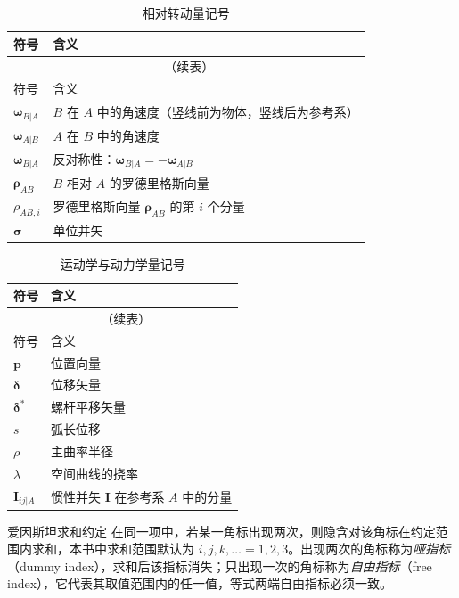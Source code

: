 \begin{longtable}{ll}
\caption{相对转动量记号}\label{tab:符号说明:相对量}\\
\toprule
符号 & 含义 \\
\midrule
\endfirsthead
\multicolumn{2}{c}{\tablename~\thetable{}（续表）}\\
\toprule
符号 & 含义 \\
\midrule
\endhead
$\bm{\omega}_{B|A}$ & $B$ 在 $A$ 中的角速度（竖线前为物体，竖线后为参考系） \\
$\bm{\omega}_{A|B}$ & $A$ 在 $B$ 中的角速度 \\
$\bm{\omega}_{B|A}$ & 反对称性：$\bm{\omega}_{B|A}=-\bm{\omega}_{A|B}$ \\
$\bm{\rho}_{AB}$ & $B$ 相对 $A$ 的罗德里格斯向量 \\
$\rho_{AB,i}$ & 罗德里格斯向量 $\bm{\rho}_{AB}$ 的第 $i$ 个分量 \\
$\bm{\sigma}$ & 单位并矢 \\
\bottomrule
\end{longtable}

\begin{longtable}{ll}
\caption{运动学与动力学量记号}\label{tab:符号说明:运动学}\\
\toprule
符号 & 含义 \\
\midrule
\endfirsthead
\multicolumn{2}{c}{\tablename~\thetable{}（续表）}\\
\toprule
符号 & 含义 \\
\midrule
\endhead
$\mathbf{p}$ & 位置向量 \\
$\bm{\delta}$ & 位移矢量 \\
$\bm{\delta}^{*}$ & 螺杆平移矢量 \\
$s$ & 弧长位移 \\
$\rho$ & 主曲率半径 \\
$\lambda$ & 空间曲线的挠率 \\
$\bm{I}_{ij|A}$ & 惯性并矢 $\bm{I}$ 在参考系 $A$ 中的分量 \\
\bottomrule
\end{longtable}

\begin{mydefinition}{爱因斯坦求和约定}
    在同一项中，若某一角标出现两次，则隐含对该角标在约定范围内求和，本书中求和范围默认为 $i,j,k,\dots=1,2,3$。出现两次的角标称为\emph{哑指标}（dummy index），求和后该指标消失；只出现一次的角标称为\emph{自由指标}（free index），它代表其取值范围内的任一值，等式两端自由指标必须一致。
\end{mydefinition}

